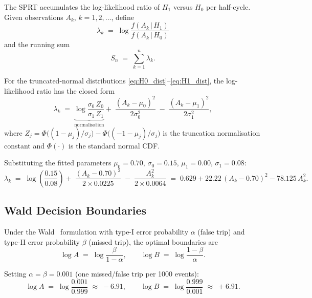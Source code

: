 \documentclass[11pt, a4paper]{article}
\newcommand{\Ak}{A_k}
\newcommand{\Sn}{S_n}
\newcommand{\logA}{\log A}
\newcommand{\logB}{\log B}
\begin{document}
The SPRT accumulates the log-likelihood ratio of $H_1$ versus $H_0$ per
half-cycle.  Given observations $\Ak$, $k = 1, 2, \ldots$, define
\begin{equation}
  \lambda_k \;=\; \log \frac{f(\Ak\,|\,H_1)}{f(\Ak\,|\,H_0)}
  \label{eq:llr_def}
\end{equation}
and the running sum
\begin{equation}
  \Sn \;=\; \sum_{k=1}^{n} \lambda_k.
  \label{eq:Sn_def}
\end{equation}

For the truncated-normal distributions \eqref{eq:H0_dist}--\eqref{eq:H1_dist},
the log-likelihood ratio has the closed form
\begin{equation}
  \lambda_k \;=\;
  \underbrace{\log\frac{\sigma_0\,Z_0}{\sigma_1\,Z_1}}_{\text{normalisation}}
  +\; \frac{(\Ak - \mu_0)^2}{2\sigma_0^2}
  \;-\; \frac{(\Ak - \mu_1)^2}{2\sigma_1^2},
  \label{eq:llr_tn}
\end{equation}
where $Z_j = \Phi\bigl((1-\mu_j)/\sigma_j\bigr) - \Phi\bigl((-1-\mu_j)/\sigma_j\bigr)$
is the truncation normalisation constant and $\Phi(\cdot)$ is the standard
normal CDF.

Substituting the fitted parameters $\mu_0 = 0.70$, $\sigma_0 = 0.15$,
$\mu_1 = 0.00$, $\sigma_1 = 0.08$:
\begin{equation}
  \lambda_k \;=\;
  \log\!\left(\frac{0.15}{0.08}\right)
  +\; \frac{(\Ak - 0.70)^2}{2\times 0.0225}
  \;-\; \frac{\Ak^2}{2\times 0.0064}
  \;=\; 0.629 + 22.22\,(\Ak - 0.70)^2 - 78.125\,\Ak^2.
  \label{eq:llr_numeric}
\end{equation}

\subsection{Wald Decision Boundaries}
\label{sec:wald}

Under the Wald~\cite{Wald1947} formulation with type-I error probability
$\alpha$ (false trip) and type-II error probability $\beta$ (missed trip), the
optimal boundaries are
\begin{equation}
  \logA \;=\; \log\!\frac{\beta}{1-\alpha}, \qquad
  \logB \;=\; \log\!\frac{1-\beta}{\alpha}.
  \label{eq:wald_boundaries}
\end{equation}

Setting $\alpha = \beta = 0.001$ (one missed/false trip per 1000 events):
\begin{equation}
  \boxed{\logA \;=\; \log\!\frac{0.001}{0.999} \;\approx\; -6.91,
  \qquad
  \logB \;=\; \log\!\frac{0.999}{0.001} \;\approx\; +6.91.}
  \label{eq:wald_numeric}
\end{equation}
\end{document}
